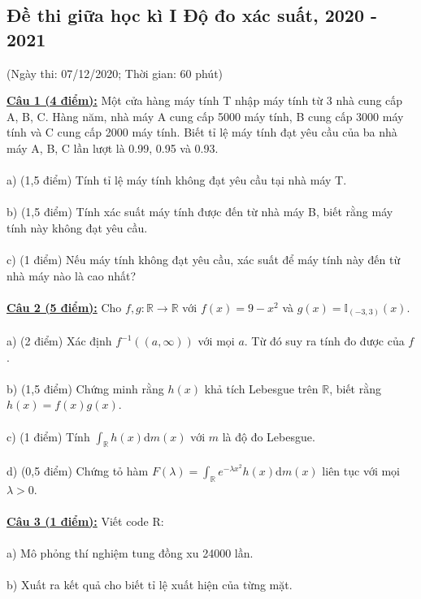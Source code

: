 \documentclass[10pt, a4paper]{article}
\begin{document}
\newpage

\subsection{Đề thi giữa học kì I Độ đo xác suất, 2020 - 2021}
\begin{center}
	\color{blue}(Ngày thi: 07/12/2020; Thời gian: 60 phút)
\end{center}
\color{red}\underline{\textbf{Câu 1 (4 điểm):}} \color{black}Một cửa hàng máy tính T nhập máy tính từ 3 nhà cung cấp A, B, C. Hàng năm, nhà máy A cung cấp 5000 máy tính, B cung cấp 3000 máy tính và C cung cấp 2000 máy tính. Biết tỉ lệ máy tính đạt yêu cầu của ba nhà máy A, B, C lần lượt là 0.99, 0.95 và 0.93.\\\\
\color{red}a) (1,5 điểm) \color{black}Tính tỉ lệ máy tính không đạt yêu cầu tại nhà máy T.\\\\
\color{red}b) (1,5 điểm) \color{black}Tính xác suất máy tính được đến từ nhà máy B, biết rằng máy tính này không đạt yêu cầu.\\\\
\color{red}c) (1 điểm) \color{black}Nếu máy tính không đạt yêu cầu, xác suất để máy tính này đến từ nhà máy nào là cao nhất?\\\\
\color{red}\underline{\textbf{Câu 2 (5 điểm):}} \color{black}Cho $f,g:\mathbb R\rightarrow\mathbb R$ với $f(x)=9-x^2$ và $g(x)=\mathbb I_{(-3,3)}(x)$.\\\\
\color{red}a) (2 điểm) \color{black}Xác định $f^{-1}((a,\infty))$ với mọi $a$. Từ đó suy ra tính đo được của $f$.\\\\
\color{red}b) (1,5 điểm) \color{black}Chứng minh rằng $h(x)$ khả tích Lebesgue trên $\mathbb R$, biết rằng $h(x)=f(x)g(x)$.\\\\
\color{red}c) (1 điểm) \color{black}Tính $\displaystyle\int_{\mathbb R}h(x)\text{d}m(x)$ với $m$ là độ đo Lebesgue.\\\\
\color{red}d) (0,5 điểm) \color{black}Chứng tỏ hàm $F(\lambda)=\displaystyle\int_{\mathbb R}e^{-\lambda x^2}h(x)\text{d}m(x)$ liên tục với mọi $\lambda>0$.\\\\
\color{red}\underline{\textbf{Câu 3 (1 điểm):}} \color{black}Viết code R:\\\\
\color{red}a) \color{black}Mô phỏng thí nghiệm tung đồng xu 24000 lần.\\\\
\color{red}b) \color{black}Xuất ra kết quả cho biết tỉ lệ xuất hiện của từng mặt.
\end{document}
